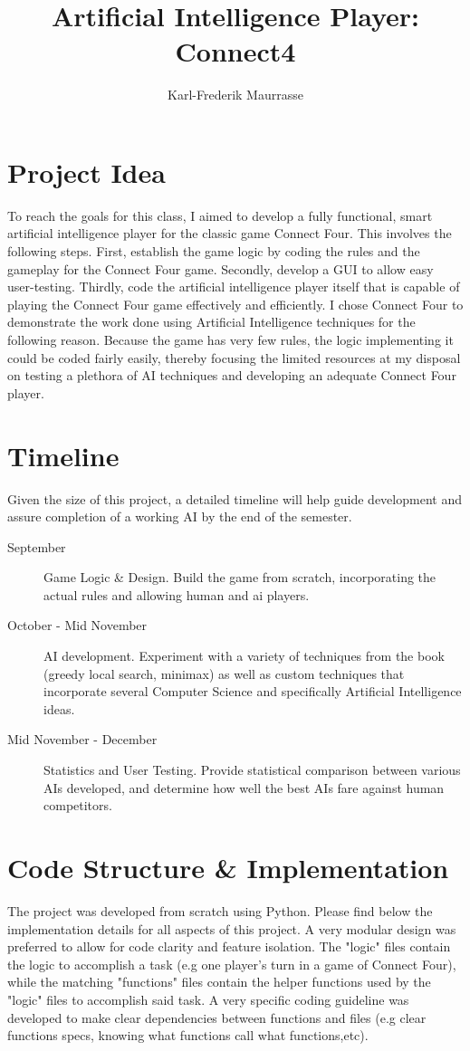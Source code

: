 \documentclass[11pt]{article}
\title{Artificial Intelligence Player: Connect4 }
\author{Karl-Frederik Maurrasse\blfootnote{}}
\begin{document}
\maketitle

\section{Project Idea}
To reach the goals for this class, I aimed to develop a fully functional, smart artificial intelligence player for the classic game Connect Four. This involves the following steps. First, establish the game logic by coding the rules and the gameplay for the Connect Four game. Secondly, develop a GUI to allow easy user-testing. Thirdly, code the artificial intelligence player itself that is capable of playing the Connect Four game effectively and efficiently. I chose Connect Four to demonstrate the work done using Artificial Intelligence techniques for the following reason. Because the game has very few rules, the logic implementing it could be coded fairly easily, thereby focusing the limited resources at my disposal on testing a plethora of AI techniques and developing an adequate Connect Four player. 

\section{Timeline}
Given the size of this project, a detailed timeline will help guide development and assure completion of a working AI by the end of the semester. 

\begin{description}
\item[September] Game Logic \& Design. Build the game from scratch, incorporating the actual rules and allowing human and ai players. 
\item[October - Mid November] AI development. Experiment with a variety of techniques from the book (greedy local search, minimax) as well as custom techniques that incorporate several Computer Science and specifically Artificial Intelligence ideas.
\item[Mid November - December] Statistics and User Testing. Provide statistical comparison between various AIs developed, and determine how well the best AIs fare against human competitors.
\end{description}

\section{Code Structure \& Implementation}
The project was developed from scratch using Python. Please find below the implementation details for all aspects of this project. A very modular design was preferred to allow for code clarity and feature isolation. The "logic" files contain the logic to accomplish a task (e.g one player's turn in a game of Connect Four), while the matching "functions" files contain the helper functions used by the "logic" files to accomplish said task. A very specific coding guideline was developed to make clear dependencies between functions and files (e.g clear functions specs, knowing what functions call what functions,etc).
\end{document}
